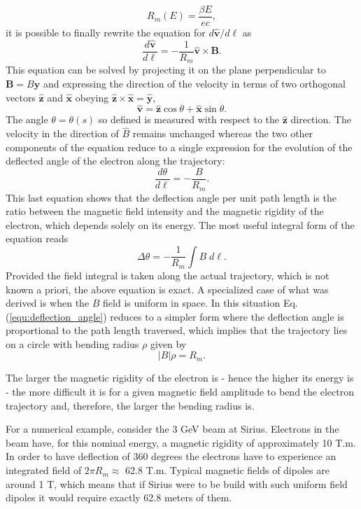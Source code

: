 \documentclass[../sands-adaptation.tex]{subfiles}
\begin{document}
\begin{equation}
R_m(E) = \frac{\beta E}{ec},
\end{equation}
it is possible to finally rewrite the equation for $d\bm{\hat{v}}/d\ell$ as 
\begin{equation}
\frac{d\bm{\hat{v}}}{d\ell} = -\frac{1}{R_m} \bm{\hat{v}} \times \bm{B}.
\end{equation}
This equation can be solved by projecting it on the plane perpendicular to $\bm{B} = B\bm{\hat{y}}$ and expressing the direction of the velocity in terms of two orthogonal vectors $\bm{\hat{z}}$ and $\bm{\hat{x}}$ obeying $\bm{\hat{z}} \times \bm{\hat{x}} = \bm{\hat{y}}$, 
\begin{equation}
\bm{\hat{v}} = \bm{\hat{z}} \cos \theta + \bm{\hat{x}} \sin \theta.
\end{equation} 
The angle $\theta = \theta(s)$ so defined is measured with respect to the $\bm{\hat{z}}$ direction. The velocity in the direction of $\hat{B}$ remains unchanged whereas the two other components of the equation reduce to a single expression for the evolution of the deflected angle of the electron along the trajectory:
\begin{equation}
\frac{d\theta}{d\ell}  = - \frac{B}{R_m}. 
\end{equation} 
This last equation shows that the deflection angle per unit path length is the ratio between the magnetic field intensity and the magnetic rigidity of the electron, which depends solely on its energy. The most useful integral form of the equation reads
\begin{equation}
\label{equ:deflection_angle}
\Delta \theta = - \frac{1}{R_m} \int{B \; d\ell}.
\end{equation} 
Provided the field integral is taken along the actual trajectory, which is not known a priori, the above equation is exact.
A specialized case of what was derived is when the $B$ field is uniform in space. In this situation Eq.(\ref{equ:deflection_angle}) reduces to a simpler form where the deflection angle is proportional to the path length traversed, which implies that the trajectory lies on a circle with bending radius $\rho$ given by
\begin{equation}
|B| \rho = {R_m}.
\end{equation} 

The larger the magnetic rigidity of the electron is - hence the higher its energy is - the more difficult it is for a given magnetic field amplitude to bend the electron trajectory and, therefore, the larger the bending radius is.

For a numerical example, consider the 3 GeV beam at Sirius. Electrons in the beam have, for this nominal energy, a magnetic rigidity of approximately 10 T.m. In order to have deflection of 360 degrees the electrons have to experience an integrated field of $2\pi R_m \approx$ 62.8 T.m. Typical magnetic fields of dipoles are around 1 T, which means that if Sirius were to be build with such uniform field dipoles it would require exactly 62.8 meters of them.
\end{document}
